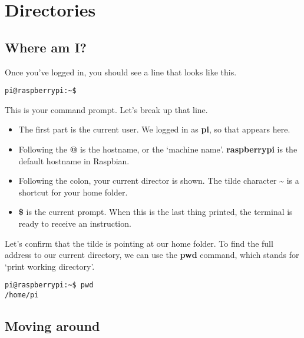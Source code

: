 \section{Directories}

	\subsection{Where am I?}
	
		Once you've logged in, you should see a line that looks like this.
	
		\begin{lstlisting}[style=Terminal]
pi@raspberrypi:~$
		\end{lstlisting}
	
		This is your command prompt. Let's break up that line.
		
		\begin{itemize}[nosep]
			\item The first part is the current user. We logged in as \textbf{pi}, so that appears here.
			\item Following the \textbf{@} is the hostname, or the `machine name'. \textbf{raspberrypi} is the default hostname in Raspbian.
			\item Following the colon, your current director is shown. The tilde character \textbf{\~} is a shortcut for your home folder.
			\item \textbf{\$} is the current prompt. When this is the last thing printed, the terminal is ready to receive an instruction.
		\end{itemize}
	
		Let's confirm that the tilde is pointing at our home folder. To find the full address to our current directory, we can use the \textbf{pwd} command, which stands for `print working directory'.

		\begin{lstlisting}[style=Terminal]
pi@raspberrypi:~$ pwd
/home/pi
		\end{lstlisting}
	
	
	
	\subsection{Moving around}
	
